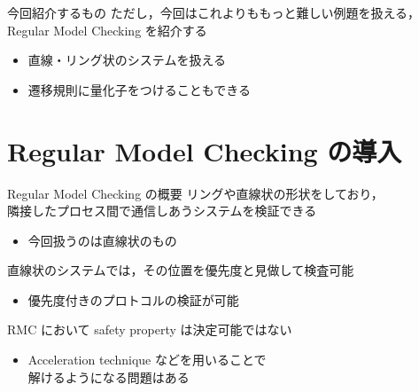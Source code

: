 \documentclass[presentation, xetex]{beamer}
\begin{document}
\begin{frame}[label={sec:org2c533da}]{今回紹介するもの}
ただし，今回はこれよりももっと難しい例題を扱える，\\
Regular Model Checking を紹介する
\begin{itemize}
\item 直線・リング状のシステムを扱える
\item 遷移規則に量化子をつけることもできる
\end{itemize}
\end{frame}


\section{Regular Model Checking の導入}
\label{sec:org0d3c127}

\begin{frame}[label={sec:org6d41556}]{Regular Model Checking の概要}
リングや直線状の形状をしており，\\
隣接したプロセス間で通信しあうシステムを検証できる
\begin{itemize}
\item 今回扱うのは直線状のもの
\end{itemize}



直線状のシステムでは，その位置を優先度と見做して検査可能
\begin{itemize}
\item 優先度付きのプロトコルの検証が可能
\end{itemize}


\hspace{1em}

RMC において \alert{\alert{safety property は決定可能ではない}}
\begin{itemize}
\item Acceleration technique などを用いることで\\
解けるようになる問題はある
\end{itemize}
\end{frame}
\end{document}
